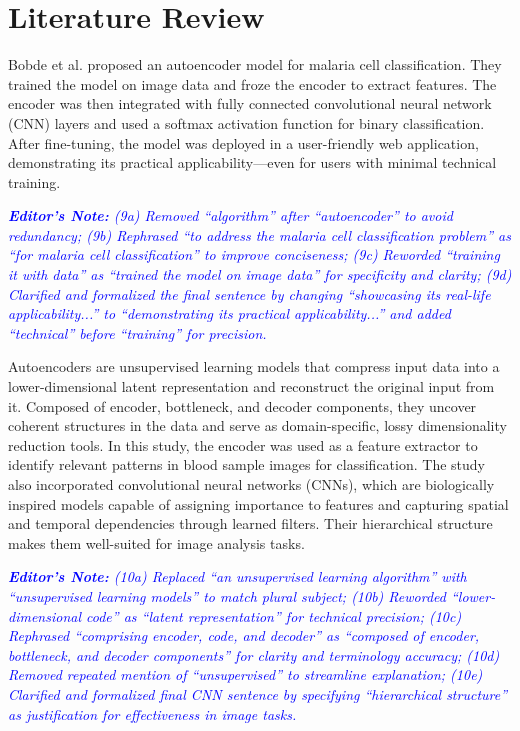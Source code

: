 \documentclass[journal,12pt,onecolumn,draftcls]{IEEEtran}
\newcommand{\editornote}[1]{\par\textit{\textcolor{blue}{\textbf{Editor's Note:} #1}}\par}
\begin{document}
\section{Literature Review}
Bobde et al. \cite{bobde2022} proposed an autoencoder model for malaria cell classification. They trained the model on image data and froze the encoder to extract features. The encoder was then integrated with fully connected convolutional neural network (CNN) layers and used a softmax activation function for binary classification. After fine-tuning, the model was deployed in a user-friendly web application, demonstrating its practical applicability—even for users with minimal technical training.

\editornote{(9a) Removed “algorithm” after “autoencoder” to avoid redundancy; 
(9b) Rephrased “to address the malaria cell classification problem” as “for malaria cell classification” to improve conciseness; 
(9c) Reworded “training it with data” as “trained the model on image data” for specificity and clarity; 
(9d) Clarified and formalized the final sentence by changing “showcasing its real-life applicability...” to “demonstrating its practical applicability...” and added “technical” before “training” for precision.}

Autoencoders are unsupervised learning models that compress input data into a lower-dimensional latent representation and reconstruct the original input from it. Composed of encoder, bottleneck, and decoder components, they uncover coherent structures in the data and serve as domain-specific, lossy dimensionality reduction tools. In this study, the encoder was used as a feature extractor to identify relevant patterns in blood sample images for classification. The study also incorporated convolutional neural networks (CNNs), which are biologically inspired models capable of assigning importance to features and capturing spatial and temporal dependencies through learned filters. Their hierarchical structure makes them well-suited for image analysis tasks.

\editornote{(10a) Replaced “an unsupervised learning algorithm” with “unsupervised learning models” to match plural subject; 
(10b) Reworded “lower-dimensional code” as “latent representation” for technical precision; 
(10c) Rephrased “comprising encoder, code, and decoder” as “composed of encoder, bottleneck, and decoder components” for clarity and terminology accuracy; 
(10d) Removed repeated mention of “unsupervised” to streamline explanation; 
(10e) Clarified and formalized final CNN sentence by specifying “hierarchical structure” as justification for effectiveness in image tasks.}
\end{document}
